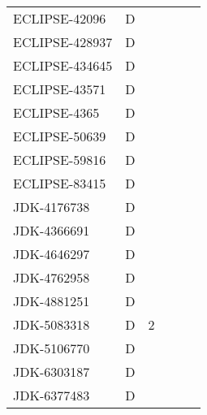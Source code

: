 \begin{table}[!htp]
{\begin{tabular}{lllll}
    ECLIPSE-42096  & D        & ~             & ~               & ~                                           \\
    ECLIPSE-428937 & D        & ~             & ~               & ~                                           \\
    ECLIPSE-434645 & D        & ~             & ~               & ~                                           \\
    ECLIPSE-43571  & D        & ~             & ~               & ~                                           \\
    ECLIPSE-4365   & D        & ~             & ~               & ~                                           \\
    ECLIPSE-50639  & D        & ~             & ~               & ~                                           \\
    ECLIPSE-59816  & D        & ~             & ~               & ~                                           \\
    ECLIPSE-83415  & D        & ~             & ~               & ~                                           \\
    JDK-4176738    & D        & ~             & ~               & ~                                           \\
    JDK-4366691    & D        & ~             & ~               & ~                                           \\
    JDK-4646297    & D        & ~             & ~               & ~                                           \\
    JDK-4762958    & D        & ~             & ~               & ~                                           \\
    JDK-4881251    & D        & ~             & ~               & ~                                           \\
    JDK-5083318    & D        & 2             & ~               & ~                                           \\
    JDK-5106770    & D        & ~             & ~               & ~                                           \\
    JDK-6303187    & D        & ~             & ~               & ~                                           \\
    JDK-6377483    & D        & ~             & ~               & ~                                           \\

\end{tabular}}
\end{table}
